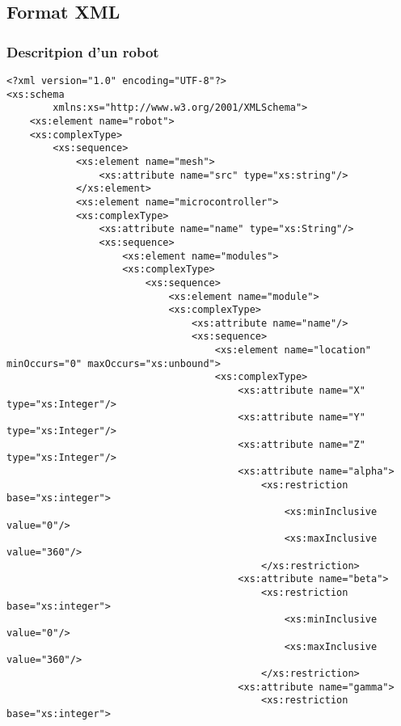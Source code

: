 \subsection{Format XML}
\subsubsection{Descritpion d'un robot}
\begin{changemargin}{-1cm}{-1cm}
\begin{lstlisting}[caption=Description du Robot, label=descbot]
<?xml version="1.0" encoding="UTF-8"?>
<xs:schema
        xmlns:xs="http://www.w3.org/2001/XMLSchema">
    <xs:element name="robot">
    <xs:complexType>
        <xs:sequence>
            <xs:element name="mesh">
                <xs:attribute name="src" type="xs:string"/>
            </xs:element>
            <xs:element name="microcontroller">
            <xs:complexType>
				<xs:attribute name="name" type="xs:String"/>
                <xs:sequence>
                    <xs:element name="modules">
                    <xs:complexType>
                        <xs:sequence>
                            <xs:element name="module">
                            <xs:complexType>
								<xs:attribute name="name"/>
                                <xs:sequence>
                                    <xs:element name="location" minOccurs="0" maxOccurs="xs:unbound">
                                    <xs:complexType>
                                        <xs:attribute name="X" type="xs:Integer"/>
                                        <xs:attribute name="Y" type="xs:Integer"/>
                                        <xs:attribute name="Z" type="xs:Integer"/>
                                        <xs:attribute name="alpha">
                                            <xs:restriction base="xs:integer">
                                                <xs:minInclusive value="0"/>
                                                <xs:maxInclusive value="360"/>
                                            </xs:restriction> 
                                        <xs:attribute name="beta">
                                            <xs:restriction base="xs:integer">
                                                <xs:minInclusive value="0"/>
                                                <xs:maxInclusive value="360"/>
                                            </xs:restriction>
                                        <xs:attribute name="gamma">
                                            <xs:restriction base="xs:integer">

\end{lstlisting}
\end{changemargin}
